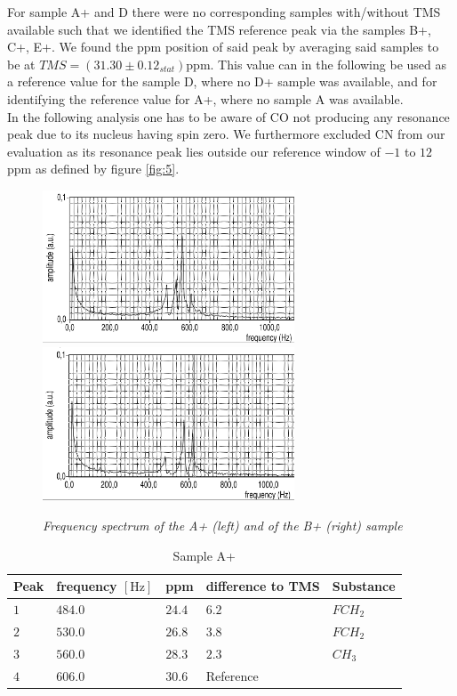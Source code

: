 For sample A+ and D there were no corresponding samples with/without TMS available such that we identified the TMS reference peak via the samples B+, C+, E+. We found the ppm position of said peak by averaging said samples to be at $ TMS = \left(31.30 \pm 0.12_{stat} \right) \mathrm{ppm}$. This value can in the following be used as a reference value for the sample D, where no D+ sample was available, and for identifying the reference value for A+, where no sample A was available.\\
In the following analysis one has to be aware of CO not producing any resonance peak due to its nucleus having spin zero. We furthermore excluded CN from our evaluation as its resonance peak lies outside our reference window of $-1$ to $12$ ppm as defined by figure \ref{fig:5}.

\begin{figure}[h]
	\centering
	\includegraphics[width=75mm]{A+}
	\includegraphics[width=75mm]{B+}
	\caption{\itshape Frequency spectrum of the A+ (left) and of the B+ (right) sample}
	\label{fig:6}
\end{figure}

\begin{table}[h]
\centering
	\begin{tabular}{lllll}
		\toprule
		Peak & frequency $\left[\mathrm{Hz}\right]$ & ppm & difference to TMS & Substance \\
		\midrule
		$ 1$ & $484.0$ & $24.4$ & $6.2$ & $FCH_2$\\
		
		$ 2$ & $530.0$ & $26.8$ &$ 3.8$ & $FCH_2$\\
		
		$ 3$ & $560.0$ &$28.3$ &$ 2.3$ & $CH_3$\\
		
		$ 4$ & $606.0$ &$ 30.6$ & Reference & \\
		
		\bottomrule
	\end{tabular}
	\caption{Sample A+}
	\label{tab:2}
\end{table}



